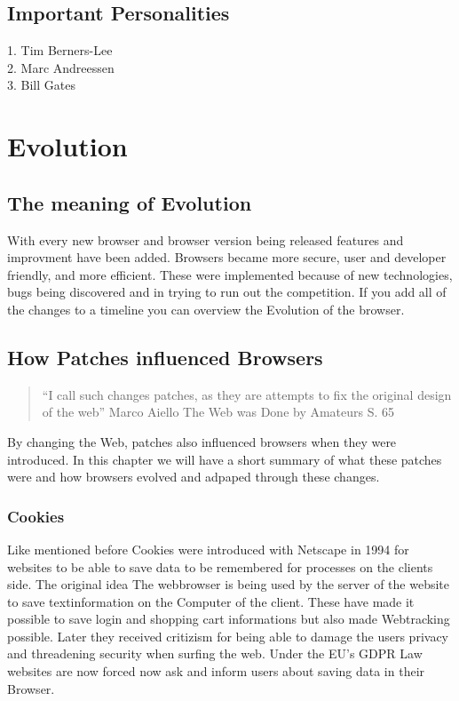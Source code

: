 \documentclass[runningheads]{llncs}
\begin{document}
		\subsection{Important Personalities}
		1. Tim Berners-Lee\\
		2. Marc Andreessen\\
		3. Bill Gates\\
	\section{Evolution}
		\subsection{The meaning of Evolution}
		With every new browser and browser version being released features and improvment have been added. Browsers became more secure, user and developer friendly, and more efficient. These were implemented because of new technologies, bugs being discovered and in trying to run out the competition. If you add all of the changes to a timeline you can overview the Evolution of the browser.
		\subsection{How Patches influenced Browsers}
			\begin{quote}``I call such changes patches, as they are attempts to fix the original design of the web'' Marco Aiello The Web was Done by Amateurs S. 65 \end{quote}
		By changing the Web, patches also influenced browsers when they were introduced. In this chapter we will have a short summary of what these patches were and how browsers evolved and adpaped through these changes.
			\subsubsection{Cookies}
			Like mentioned before Cookies were introduced with Netscape in 1994 for websites to be able to save data to be remembered for processes on the clients side. The original idea The webbrowser is being used by the server of the website to save textinformation on the Computer of the client. These have made it possible to save login and shopping cart informations but also made Webtracking possible. Later they received critizism for being able to damage the users privacy and threadening security when surfing the web. Under the EU's GDPR Law websites are now forced now ask and inform users about saving data in their Browser.
\end{document}
